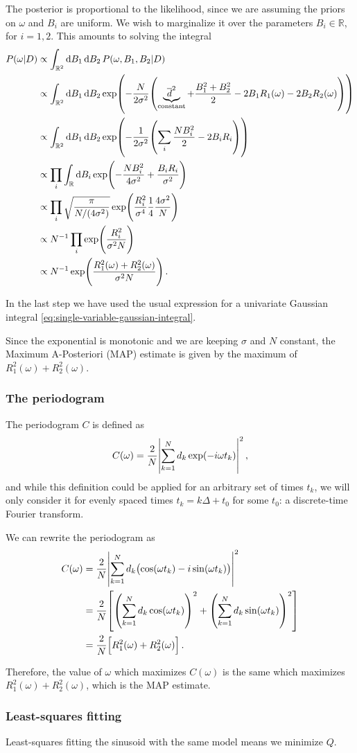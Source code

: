\documentclass[main.tex]{subfiles}
\begin{document}
The posterior is proportional to the likelihood, since we are assuming the priors on \(\omega \) and \(B_i\) are uniform. 
We wish to marginalize it over the parameters \(B_i \in \mathbb{R}\), for \(i = 1, 2\).
This amounts to solving the integral 
%
\begin{align}
P (\omega | D) &\propto \int_{\mathbb{R}^2} \dd{B_1 } \dd{B_2 } P (\omega , B_1 , B_2  | D)   \\
&\propto \int_{\mathbb{R}^2} \dd{B_1 } \dd{B_2 }
\exp(- \frac{N}{2 \sigma^2} \qty(\underbrace{\overline{d}^2}_{\text{constant}} + \frac{B_1^2 + B_2^2}{2} - 2 B_1 R_1(\omega ) -2  B_2 R_2(\omega )))  \\
&\propto \int_{\mathbb{R}^2} \dd{B_1} \dd{B_2 } \exp(- \frac{1}{2 \sigma^2} \qty( \sum _{i} \frac{N B_i^2}{2} - 2 B_i R_i)) \\
&\propto \prod_i \int_{\mathbb{R}} \dd{B_i}
\exp(- \frac{N B_i^2}{4 \sigma^2} + \frac{B_i R_i}{\sigma^2})  \\
&\propto \prod_i \sqrt{ \frac{\pi}{N / (4 \sigma^2)}}
\exp( \frac{R_i^2}{\sigma^{4}} \frac{1}{4} \frac{4 \sigma^2 }{N})  \\
&\propto N^{-1} \prod_i \exp( \frac{R_i^2}{\sigma^2 N})  \\
&\propto N^{-1} \exp(\frac{R_1^2(\omega ) + R_2^2(\omega )}{\sigma^2 N})
\,.
\end{align}

In the last step we have used the usual expression for a univariate Gaussian integral \eqref{eq:single-variable-gaussian-integral}. 

Since the exponential is monotonic and we are keeping \(\sigma \) and \(N \) constant, the Maximum A-Posteriori (MAP) estimate is given by the maximum of \(R_1^2 (\omega ) + R_2^2 (\omega )\).

\subsubsection{The periodogram}

The periodogram \(C\) is defined as 
%
\begin{align}
C(\omega ) = \frac{2}{N} \abs{\sum _{k=1}^{N} d_k \exp(- i \omega t_k)}^2
\,,
\end{align}
%
and while this definition could be applied for an arbitrary set of times \(t_k\), we will only consider it for evenly spaced times \(t_k = k \Delta  + t_0 \) for some \(t_0 \): a discrete-time Fourier transform. 

We can rewrite the periodogram as 
%
\begin{align}
C(\omega ) &= \frac{2}{N} \abs{\sum _{k=1}^{N} d_k \qty(\cos(\omega t_k) - i \sin(\omega t_k))}^2  \\
&= \frac{2}{N} \qty[ \qty(\sum _{k=1}^{N} d_k \cos(\omega t_k))^2 + \qty(\sum _{k=1}^{N} d_k \sin(\omega t_k))^2]  \\
&= \frac{2}{N} \qty[R_1^2(\omega ) + R_2^2 (\omega )]
\,.
\end{align}

Therefore, the value of \(\omega \) which maximizes \(C(\omega )\) is the same which maximizes \(R_1^2 (\omega ) + R_2^2 (\omega )\), which is the MAP estimate. 

\subsubsection{Least-squares fitting}

Least-squares fitting the sinusoid with the same model means we minimize \(Q\). 
\end{document}
